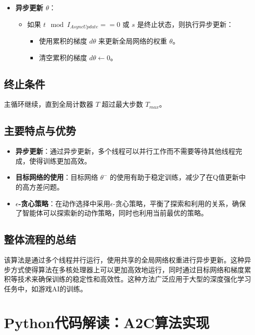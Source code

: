 \documentclass[twocolumn, 10pt]{article} %
\theoremstyle{remark}
\begin{document}
\begin{itemize}
    \item \textbf{异步更新 \( \theta \)}：
    \begin{itemize}
        \item 如果 \( t \mod I_{AsyncUpdate} == 0 \) 或 \( s \) 是终止状态，则执行异步更新：
        \begin{itemize}
            \item 使用累积的梯度 \( d\theta \) 来更新全局网络的权重 \( \theta \)。
            \item 清空累积的梯度 \( d\theta \leftarrow 0 \)。
        \end{itemize}
    \end{itemize}
\end{itemize}

\subsection{终止条件}
主循环继续，直到全局计数器 \( T \) 超过最大步数 \( T_{max} \)。

\subsection{主要特点与优势}
\begin{itemize}
    \item \textbf{异步更新}：通过异步更新，多个线程可以并行工作而不需要等待其他线程完成，使得训练更加高效。
    \item \textbf{目标网络的使用}：目标网络 \( \theta^- \) 的使用有助于稳定训练，减少了在Q值更新中的高方差问题。
    \item \textbf{\(\epsilon\)-贪心策略}：在动作选择中采用\(\epsilon\)-贪心策略，平衡了探索和利用的关系，确保了智能体可以探索新的动作策略，同时也利用当前最优的策略。
\end{itemize}

\subsection{整体流程的总结}
该算法是通过多个线程并行运行，使用共享的全局网络权重进行异步更新。这种异步方式使得算法在多核处理器上可以更加高效地运行，同时通过目标网络和梯度累积等技术来确保训练的稳定性和高效性。这种方法广泛应用于大型的深度强化学习任务中，如游戏AI的训练。


\appendix
\section{Python代码解读：A2C算法实现}
\end{document}
